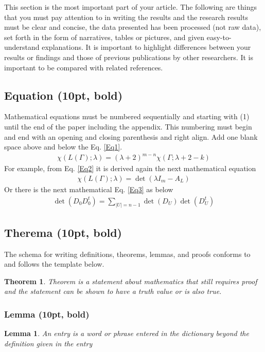 \documentclass{article}
\newcounter{lemma}
\newtheorem{lemma}{Lemma}
\newcounter{theorem}
\newtheorem{theorem}{Theorem}
\begin{document}
This section is the most important part of your article. The following are things that you must pay attention to in writing the results and the research results must be clear and concise, the data presented has been processed (not raw data), set forth in the form of narratives, tables or pictures, and given easy-to-understand explanations. It is important to highlight differences between your results or findings and those of previous publications by other researchers. It is important to be compared with related references.
\subsection{Equation (10pt, bold)}
Mathematical equations must be numbered sequentially and starting with (1) until the end of the paper including the appendix. This numbering must begin and end with an opening and closing parenthesis and right align. Add one blank space above and below the Eq. \ref{Eq1}.
\begin{eqnarray}
	\chi(L(\Gamma); \lambda)=(\lambda+2)^{m-n}\chi(\Gamma;\lambda+2-k)
	\label{Eq1}
\end{eqnarray}
For example, from Eq. \ref{Eq2} it is derived again the next mathematical equation
\begin{eqnarray}
	\chi(L(\Gamma); \lambda)=\det (\lambda I_{m}-A_{L})
		\label{Eq2}
\end{eqnarray}
Or there is the next mathematical Eq. \ref{Eq3} as below
\begin{eqnarray}
\det(D_{0}D_{0}^{t})=\sum_{|U|=n-1} \det(D_{U})\det(D_{U}^{t})
	\label{Eq3}
\end{eqnarray}
\subsection{Therema (10pt, bold)}
The schema for writing definitions, theorems, lemmas, and proofs conforms to and follows the template below.

\begin{theorem}
	 Theorem is a statement about mathematics that still requires proof and the statement can be shown to have a truth value or is also true.
\end{theorem}

\subsubsection{Lemma (10pt, bold)}
\begin{lemma}
	An entry is a word or phrase entered in the dictionary beyond the definition given in the entry
\end{lemma}
\end{document}

